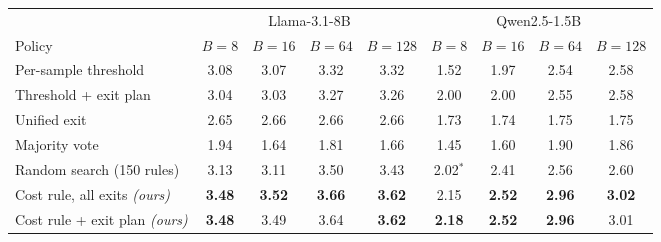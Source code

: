 \begin{tabular}{@{}lcccccccc@{}}
\toprule
 & \multicolumn{4}{c}{Llama-3.1-8B} & \multicolumn{4}{c}{Qwen2.5-1.5B} \\
\cmidrule(lr){2-5}\cmidrule(lr){6-9}
Policy & $B=8$ & $B=16$ & $B=64$ & $B=128$ & $B=8$ & $B=16$ & $B=64$ & $B=128$ \\
\midrule
Per-sample threshold & 3.08 & 3.07 & 3.32 & 3.32 & 1.52 & 1.97 & 2.54 & 2.58 \\
Threshold + exit plan & 3.04 & 3.03 & 3.27 & 3.26 & 2.00 & 2.00 & 2.55 & 2.58 \\
Unified exit & 2.65 & 2.66 & 2.66 & 2.66 & 1.73 & 1.74 & 1.75 & 1.75 \\
Majority vote & 1.94 & 1.64 & 1.81 & 1.66 & 1.45 & 1.60 & 1.90 & 1.86 \\
Random search (150 rules) & 3.13 & 3.11 & 3.50 & 3.43 & 2.02$^{*}$ & 2.41 & 2.56 & 2.60 \\
\midrule
Cost rule, all exits \textit{(ours)} & \textbf{3.48} & \textbf{3.52} & \textbf{3.66} & \textbf{3.62} & 2.15 & \textbf{2.52} & \textbf{2.96} & \textbf{3.02} \\
Cost rule + exit plan \textit{(ours)} & \textbf{3.48} & 3.49 & 3.64 & \textbf{3.62} & \textbf{2.18} & \textbf{2.52} & \textbf{2.96} & 3.01 \\
\bottomrule
\end{tabular}
